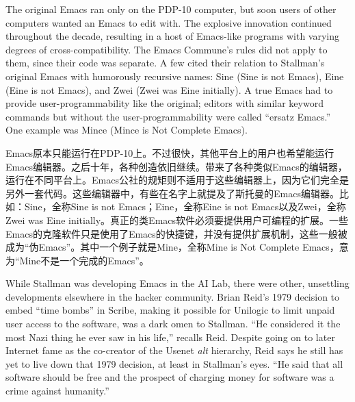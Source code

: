 \ifdefined\eng
The original Emacs ran only on the PDP-10 computer, but soon users of other computers wanted an Emacs to edit with. The explosive innovation continued throughout the decade, resulting in a host of Emacs-like programs with varying degrees of cross-compatibility. The Emacs Commune's rules did not apply to them, since their code was separate. A few cited their relation to Stallman's original Emacs with humorously recursive names: Sine (Sine is not Emacs), Eine (Eine is not Emacs), and Zwei (Zwei was Eine initially). A true Emacs had to provide user-programmability like the original; editors with similar keyword commands but without the user-programmability were called ``ersatz Emacs.''  One example was Mince (Mince is Not Complete Emacs). 
\fi

\ifdefined\chs
Emacs原本只能运行在PDP-10上。不过很快，其他平台上的用户也希望能运行Emacs编辑器。之后十年，各种创造依旧继续。带来了各种类似Emacs的编辑器，运行在不同平台上。Emacs公社的规矩则不适用于这些编辑器上，因为它们完全是另外一套代码。这些编辑器中，有些在名字上就提及了斯托曼的Emacs编辑器。比如：Sine，全称Sine is not Emacs；Eine，全称Eine is not Emacs以及Zwei，全称Zwei was Eine initially。真正的类Emacs软件必须要提供用户可编程的扩展。一些Emacs的克隆软件只是使用了Emacs的快捷键，并没有提供扩展机制，这些一般被成为``伪Emacs''。其中一个例子就是Mine，全称Mine is Not Complete Emacs，意为``Mine不是一个完成的Emacs''。
\fi

\ifdefined\eng
While Stallman was developing Emacs in the AI Lab, there were other, unsettling developments elsewhere in the hacker community. Brian Reid's 1979 decision to embed ``time bombs'' in Scribe, making it possible for Unilogic to limit unpaid user access to the software, was a dark omen to Stallman. ``He considered it the most Nazi thing he ever saw in his life,'' recalls Reid. Despite going on to later Internet fame as the co-creator of the Usenet \textit{alt} hierarchy, Reid says he still has yet to live down that 1979 decision, at least in Stallman's eyes. ``He said that all software should be free and the prospect of charging money for software was a crime against humanity.''
\fi

